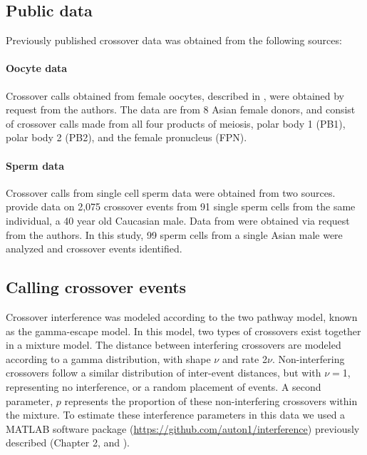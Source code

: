 \subsection{Public data}
Previously published crossover data was obtained from the following sources:

\paragraph{Oocyte data}
Crossover calls obtained from female oocytes, described in \citet{Hou2013}, were obtained by request from the authors.
The data are from 8 Asian female donors, and consist of crossover calls made from all four products of meiosis, polar body 1 (PB1), polar body 2 (PB2), and the female pronucleus (FPN).

\paragraph{Sperm data}
Crossover calls from single cell sperm data were obtained from two sources.
%
\citet{Wang2012} provide data on 2,075 crossover events from 91 single sperm cells from the same individual, a 40 year old Caucasian male.
%
Data from \citet{Lu2012} were obtained via request from the authors.
In this study, 99 sperm cells from a single Asian male were analyzed and crossover events identified.

\subsection{Calling crossover events}
Crossover interference was modeled according to the two pathway model, known as the gamma-escape model.
In this model, two types of crossovers exist together in a mixture model.
The distance between interfering crossovers are modeled according to a gamma distribution, with shape $\nu$ and rate 2$\nu$.
Non-interfering crossovers follow a similar distribution of inter-event distances, but with $\nu=$1, representing no interference, or a random placement of events.
A second parameter, $p$ represents the proportion of these non-interfering crossovers within the mixture.
To estimate these interference parameters in this data we used a MATLAB software package (\url{https://github.com/auton1/interference}) previously described (Chapter 2, and \citet{Campbell2015}).



